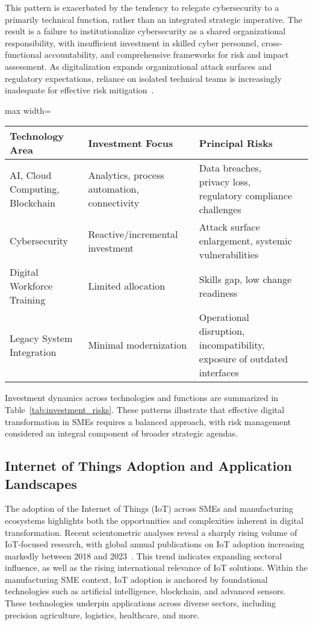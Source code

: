 \documentclass[sigconf]{acmart}
\begin{document}
This pattern is exacerbated by the tendency to relegate cybersecurity to a primarily technical function, rather than an integrated strategic imperative. The result is a failure to institutionalize cybersecurity as a shared organizational responsibility, with insufficient investment in skilled cyber personnel, cross-functional accountability, and comprehensive frameworks for risk and impact assessment. As digitalization expands organizational attack surfaces and regulatory expectations, reliance on isolated technical teams is increasingly inadequate for effective risk mitigation~\cite{ref35}.

\begin{table*}[htbp]
\centering
\caption{Key Investment Priorities and Associated Risks in SME Digital Transformation}
\label{tab:investment_risks}
\begin{adjustbox}{max width=\textwidth}
\begin{tabular}{llll}
\toprule
\textbf{Technology Area} & \textbf{Investment Focus} & \textbf{Principal Risks} \\
\midrule
AI, Cloud Computing, Blockchain & Analytics, process automation, connectivity & Data breaches, privacy loss, regulatory compliance challenges \\
Cybersecurity & Reactive/incremental investment & Attack surface enlargement, systemic vulnerabilities \\
Digital Workforce Training & Limited allocation & Skills gap, low change readiness \\
Legacy System Integration & Minimal modernization & Operational disruption, incompatibility, exposure of outdated interfaces \\
\bottomrule
\end{tabular}
\end{adjustbox}
\end{table*}

Investment dynamics across technologies and functions are summarized in Table~\ref{tab:investment_risks}. These patterns illustrate that effective digital transformation in SMEs requires a balanced approach, with risk management considered an integral component of broader strategic agendas.

\subsection{Internet of Things Adoption and Application Landscapes}

The adoption of the Internet of Things (IoT) across SMEs and manufacturing ecosystems highlights both the opportunities and complexities inherent in digital transformation. Recent scientometric analyses reveal a sharply rising volume of IoT-focused research, with global annual publications on IoT adoption increasing markedly between 2018 and 2023~\cite{ref33}. This trend indicates expanding sectoral influence, as well as the rising international relevance of IoT solutions. Within the manufacturing SME context, IoT adoption is anchored by foundational technologies such as artificial intelligence, blockchain, and advanced sensors. These technologies underpin applications across diverse sectors, including precision agriculture, logistics, healthcare, and more.
\end{document}
